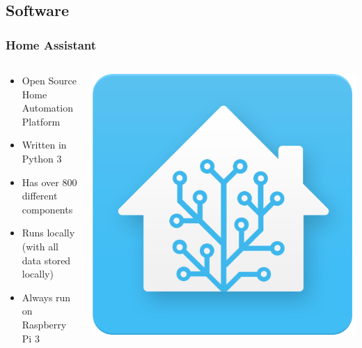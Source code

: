 \documentclass[aspectratio=169,11pt,hyperref={colorlinks=true}]{beamer}
\begin{document}
\subsection{Software}
\begin{frame}
    \frametitle{Home Assistant}
    \begin{columns}
        \begin{column}{.48\textwidth}
            \begin{itemize}
                \item Open Source Home Automation Platform
                \item Written in Python 3
                \item Has over 800 different components
                \item Runs locally (with all data stored locally)
                \item Always run on Raspberry Pi 3
            \end{itemize}
        \end{column}
        \begin{column}{.48\textwidth}
            \includegraphics[width=\textwidth]{homeassistant.png}
        \end{column}
    \end{columns}
\end{frame}
\end{document}
